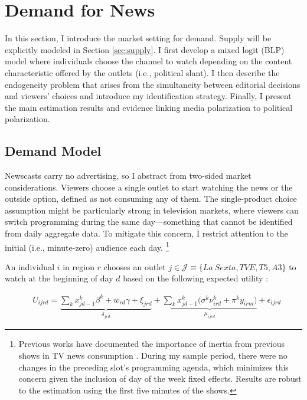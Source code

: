 \documentclass[12pt]{article}
\begin{document}
	
	
	
	
	
	
	
	

	
	
	\section{Demand for News}	\label{sec:demand}

In this section, I introduce the market setting for demand. Supply will be explicitly modeled in Section \ref{sec:supply}. I first develop a mixed logit (BLP) model \citep{berry_blp} where individuals choose the channel to watch depending on the content characteristic offered by the outlets (i.e., political slant). I then describe the endogeneity problem that arises from the simultaneity between editorial decisions and viewers' choices and introduce my identification strategy. Finally, I present the main estimation results and evidence linking media polarization to political polarization. 

	\subsection{Demand Model}



Newscasts carry no advertising, so I abstract from two-sided market considerations. Viewers choose a single outlet to start watching the news or the outside option, defined as not consuming any of them. The single-product choice assumption might be particularly strong in television markets, where viewers can switch programming during the same day—something that cannot be identified from daily aggregate data. To mitigate this concern, I restrict attention to the initial (i.e., minute-zero) audience each day. \footnote{Previous works have documented the importance of inertia from previous shows in TV news consumption \citep{richter2025structural}. During my sample period, there were no changes in the preceding slot's programming agenda, which minimizes this concern given the inclusion of day of the week fixed effects. Results are robust to the estimation using the first five minutes of the shows. }



	An individual $ i $  in region $r$ chooses an outlet $ j \in \mathcal{J}\equiv \{La \ Sexta,TVE,T5,A3\}$  to watch at the beginning of day $d$ based on the following expected utility : 
	
	
	\begin{equation}\label{eq:utility}
		\begin{aligned}
			& U_{ijrd}= \underbrace{\sum_k x_{jd-1}^k\beta^k+w_{rd}   \gamma  +  \xi_{jrd}}_{\delta_{jrd}}  + \underbrace{  \sum_k x_{jd-1}^k \Big( \sigma^k \nu_{ird}^k  + \pi^ky_{irm} \Big)}_{\mu_{ijrd}}+\epsilon_{ijrd} 
		\end{aligned}
	\end{equation} 
	
\end{document}
